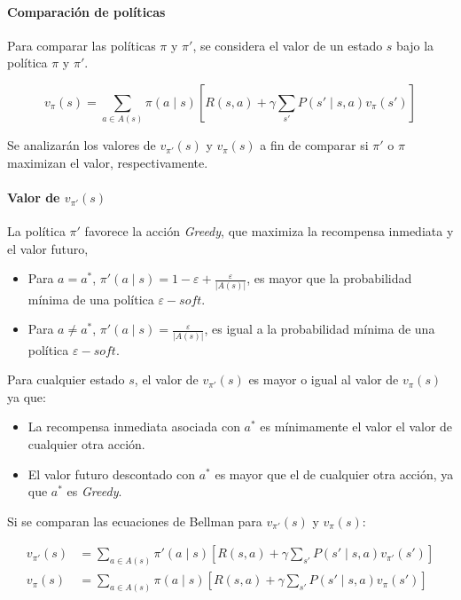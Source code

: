 \paragraph{Comparación de políticas}

Para comparar las políticas $\pi$ y $\pi'$, se considera el valor de un estado $s$ bajo la política $\pi$ y $\pi'$.

\[
    v_{\pi}(s) = \sum_{a \in A(s)} \pi(a \mid s) \left[R(s, a) + \gamma \sum_{s'} P(s' \mid s, a) v_{\pi}(s')\right]
\]

Se analizarán los valores de $v_{\pi'}(s)$ y $v_{\pi}(s)$ a fin de comparar si $\pi'$ o $\pi$ maximizan el valor, respectivamente.

\paragraph{Valor de $v_{\pi'}(s)$}

La política $\pi'$ favorece la acción \textit{Greedy}, que maximiza la recompensa inmediata y el valor futuro,

\begin{itemize}
    \item Para $a = a^{\ast}$, $\pi'(a \mid s) = 1 - \varepsilon + \frac{\varepsilon}{|A(s)|}$, es mayor que la probabilidad mínima de una política $\varepsilon -\textit{soft}$.
    \item Para $a \neq a^{\ast}$, $\pi'(a \mid s) = \frac{\varepsilon}{|A(s)|}$, es igual a la probabilidad mínima de una política $\varepsilon -\textit{soft}$.
\end{itemize}

Para cualquier estado $s$, el valor de $v_{\pi'}(s)$ es mayor o igual al valor de $v_{\pi}(s)$ ya que:

\begin{itemize}
    \item La recompensa inmediata asociada con $a^{\ast}$ es mínimamente el valor el valor de cualquier otra acción.
    \item El valor futuro descontado con $a^{\ast}$ es mayor que el de cualquier otra acción, ya que $a^{\ast}$ es \textit{Greedy}.
\end{itemize}

Si se comparan las ecuaciones de Bellman para $v_{\pi'}(s)$ y $v_{\pi}(s)$:

\begin{align*}
    v_{\pi'}(s) &= \sum_{a \in A(s)} \pi'(a \mid s) \left[R(s, a) + \gamma \sum_{s'} P(s' \mid s, a) v_{\pi'}(s')\right] \\
    v_{\pi}(s) &= \sum_{a \in A(s)} \pi(a \mid s) \left[R(s, a) + \gamma \sum_{s'} P(s' \mid s, a) v_{\pi}(s')\right]
\end{align*}

